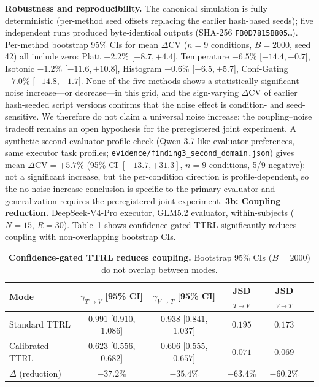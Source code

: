 \documentclass[11pt]{article}
\newcommand{\CV}{\ensuremath{\mathrm{CV}}}
\theoremstyle{definition}
\theoremstyle{remark}
\begin{document}
\textbf{Robustness and reproducibility.} The canonical simulation is fully deterministic (per-method seed offsets replacing the earlier hash-based seeds); five independent runs produced byte-identical outputs (SHA-256 \texttt{FB0D7815B805\ldots}). Per-method bootstrap 95\% CIs for mean $\Delta\CV$ ($n{=}9$ conditions, $B{=}2000$, seed 42) all include zero: Platt $-2.2\%$ [$-8.7, +4.4$], Temperature $-6.5\%$ [$-14.4, +0.7$], Isotonic $-1.2\%$ [$-11.6, +10.8$], Histogram $-0.6\%$ [$-6.5, +5.7$], Conf-Gating $-7.0\%$ [$-14.8, +1.7$]. None of the five methods shows a statistically significant noise increase---or decrease---in this grid, and the sign-varying $\Delta\CV$ of earlier hash-seeded script versions confirms that the noise effect is condition- and seed-sensitive. We therefore do not claim a universal noise increase; the coupling--noise tradeoff remains an open hypothesis for the preregistered joint experiment. A synthetic second-evaluator-profile check (Qwen-3.7-like evaluator preferences, same executor task profiles; \texttt{evidence/finding3\_second\_domain.json}) gives mean $\Delta\CV = +5.7\%$ (95\% CI $[-13.7, +31.3]$, $n{=}9$ conditions, 5/9 negative): not a significant increase, but the per-condition direction is profile-dependent, so the no-noise-increase conclusion is specific to the primary evaluator and generalization requires the preregistered joint experiment.
\textbf{3b: Coupling reduction.} DeepSeek-V4-Pro executor, GLM5.2 evaluator, within-subjects ($N{=}15$, $R{=}30$). Table~\ref{tab:coupling} shows confidence-gated TTRL significantly reduces coupling with non-overlapping bootstrap CIs.

\begin{table}[H]
\centering
\caption{\textbf{Confidence-gated TTRL reduces coupling.} Bootstrap 95\% CIs ($B{=}2000$) do not overlap between modes.}
\label{tab:coupling}
\begin{tabular}{@{}lccccc@{}}
\toprule
Mode & $\bar{\gamma}_{T \to V}$ [95\% CI] & $\bar{\gamma}_{V \to T}$ [95\% CI] & JSD$_{T \to V}$ & JSD$_{V \to T}$ \\
\midrule
Standard TTRL & $0.991$ [$0.910$, $1.086$] & $0.938$ [$0.841$, $1.037$] & $0.195$ & $0.173$ \\
Calibrated TTRL & $0.623$ [$0.556$, $0.682$] & $0.606$ [$0.555$, $0.657$] & $0.071$ & $0.069$ \\
\midrule
$\Delta$ (reduction) & $-37.2\%$ & $-35.4\%$ & $-63.4\%$ & $-60.2\%$ \\
\bottomrule
\end{tabular}
\end{table}
\end{document}

